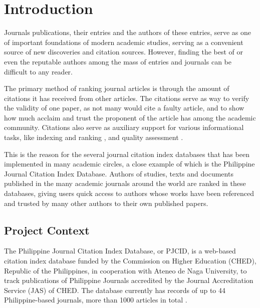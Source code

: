 \chapter{Introduction}
Journals publications, their entries and the authors of these entries, serve as one of important foundations of modern academic studies, serving as a convenient source of new discoveries and citation sources. However, finding the best of or even the reputable authors among the mass of entries and journals can be difficult to any reader. 

The primary method of ranking journal articles is through the amount of citations it has received from other articles. The citations serve as way to verify the validity of one paper, as not many would cite a faulty article, and to show how much acclaim and trust the proponent of the article has among the academic community. Citations also serve as auxiliary support for various informational tasks, like indexing and ranking \cite{rank} , and quality assessment \cite{quality}.

This is the reason for the several journal citation index databases that has been implemented in many academic circles, a close example of which is the Philippine Journal Citation Index Database. Authors of studies, texts and documents published in the many academic journals around the world are ranked in these databases, giving users quick access to authors whose works have been referenced and trusted by many other authors to their own published papers.

\section{Project Context}
The Philippine Journal Citation Index Database, or PJCID, is a web-based citation index database funded by the Commission on Higher Education (CHED), Republic of the Philippines, in cooperation with Ateneo de Naga University, to track publications of Philippine Journals accredited by the Journal Accreditation Service (JAS) of CHED. The database currently has records of up to 44 Philippine-based journals, more than 1000 articles in total \cite{pjcid}.

